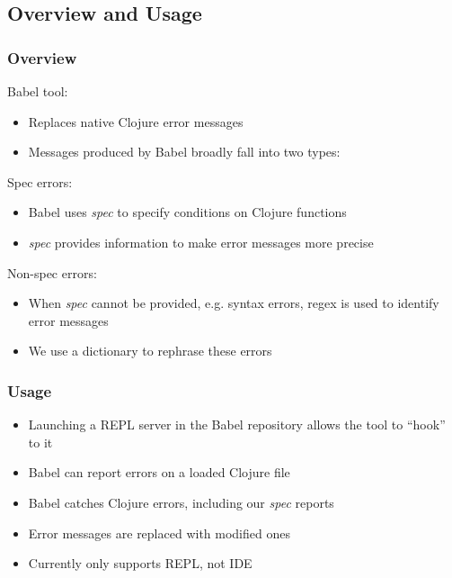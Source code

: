 \documentclass{beamer}
\begin{document}
\subsection{Overview and Usage}
\begin{frame}
    \frametitle{Overview}
   Babel tool:
    \begin{itemize}
        \item Replaces native Clojure error messages
        \item Messages produced by Babel broadly fall into two types:
    \end{itemize}
	Spec errors:
    \begin{itemize}
        \item Babel uses \textit{spec} to specify conditions on Clojure functions
        \item \textit{spec} provides information to make error messages more precise
    \end{itemize}
   Non-spec errors:
    \begin{itemize}
        \item When \textit{spec} cannot be provided, e.g. syntax errors, regex is used to identify error messages
        \item We use a dictionary to rephrase these errors
    \end{itemize}
\end{frame}


\begin{frame}
    \frametitle{Usage}
    \begin{itemize}
        \item Launching a REPL server in the Babel repository allows the tool to ``hook'' to it
	\item Babel can report errors on a loaded Clojure file
	\item Babel catches Clojure errors, including our \textit{spec} reports
	\item Error messages are replaced with modified ones
        \item Currently only supports REPL, not IDE
    \end{itemize}
\end{frame}
\end{document}
